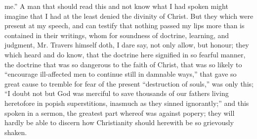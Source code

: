 me.” A man that should read this and not know what I had spoken might imagine that I had at the least denied the divinity of Christ. But they which were present at my speech, and can testify that nothing passed my lips more than is contained in their writings, whom for soundness of doctrine, learning, and judgment, Mr. Travers himself doth, I dare say, not only allow, but honour; they which heard and do know, that the doctrine here signified in so fearful manner, the doctrine that was so dangerous to the faith of Christ, that was so likely to “encourage ill-affected men to continue still in damnable ways,” that gave so great cause to tremble for fear of the present “destruction of souls,” was only this; “I doubt not but God was merciful to save thousands of our fathers living heretofore in popish superstitions, inasmuch as they sinned ignorantly;” and this spoken in a sermon, the greatest part whereof was against popery; they will hardly be able to discern how Christianity should herewith be so grievously shaken.

